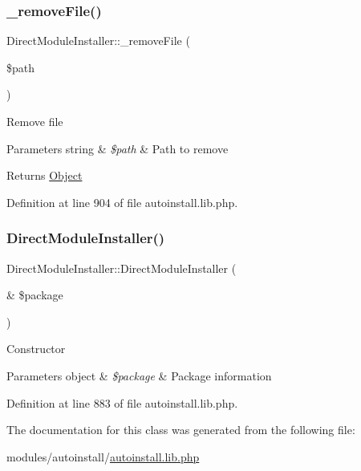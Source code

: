 \mbox{\label{classDirectModuleInstaller_a6fb855a965f6b16e450b4c97f2a79ca2}} 
\subsubsection{\texorpdfstring{\+\_\+remove\+File()}{\_removeFile()}}
{\footnotesize\ttfamily Direct\+Module\+Installer\+::\+\_\+remove\+File (\begin{DoxyParamCaption}\item[{}]{\$path }\end{DoxyParamCaption})}

Remove file


\begin{DoxyParams}[1]{Parameters}
string & {\em \$path} & Path to remove \\
\hline
\end{DoxyParams}
\begin{DoxyReturn}{Returns}
\hyperlink{classObject}{Object} 
\end{DoxyReturn}


Definition at line 904 of file autoinstall.\+lib.\+php.

\mbox{\label{classDirectModuleInstaller_a713e0cebd57a87f357d05d06445508f1}} 
\subsubsection{\texorpdfstring{Direct\+Module\+Installer()}{DirectModuleInstaller()}}
{\footnotesize\ttfamily Direct\+Module\+Installer\+::\+Direct\+Module\+Installer (\begin{DoxyParamCaption}\item[{\&}]{\$package }\end{DoxyParamCaption})}

Constructor


\begin{DoxyParams}[1]{Parameters}
object & {\em \$package} & Package information \\
\hline
\end{DoxyParams}


Definition at line 883 of file autoinstall.\+lib.\+php.



The documentation for this class was generated from the following file\+:\begin{DoxyCompactItemize}
\item 
modules/autoinstall/\hyperlink{autoinstall_8lib_8php}{autoinstall.\+lib.\+php}\end{DoxyCompactItemize}

